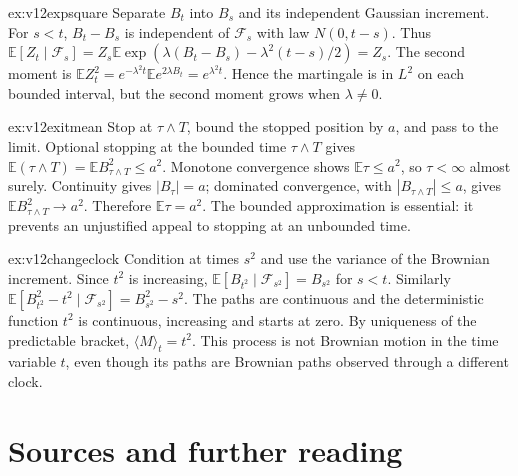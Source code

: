 \begin{solution}{ex:v12expsquare}
\idea Separate $B_t$ into $B_s$ and its independent Gaussian increment.
\writeup For $s<t$, $B_t-B_s$ is independent of $\mathcal F_s$ with law $N(0,t-s)$. Thus $\mathbb E[Z_t\mid\mathcal F_s]=Z_s\mathbb E\exp(\lambda(B_t-B_s)-\lambda^2(t-s)/2)=Z_s$. The second moment is $\mathbb EZ_t^2=e^{-\lambda^2t}\mathbb Ee^{2\lambda B_t}=e^{\lambda^2t}$. Hence the martingale is in $L^2$ on each bounded interval, but the second moment grows when $\lambda\ne0$.
\end{solution}

\begin{solution}{ex:v12exitmean}
\idea Stop at $\tau\wedge T$, bound the stopped position by $a$, and pass to the limit.
\writeup Optional stopping at the bounded time $\tau\wedge T$ gives $\mathbb E(\tau\wedge T)=\mathbb EB_{\tau\wedge T}^2\le a^2$. Monotone convergence shows $\mathbb E\tau\le a^2$, so $\tau<\infty$ almost surely. Continuity gives $|B_\tau|=a$; dominated convergence, with $|B_{\tau\wedge T}|\le a$, gives $\mathbb EB_{\tau\wedge T}^2\to a^2$. Therefore $\mathbb E\tau=a^2$. The bounded approximation is essential: it prevents an unjustified appeal to stopping at an unbounded time.
\end{solution}

\begin{solution}{ex:v12changeclock}
\idea Condition at times $s^2$ and use the variance of the Brownian increment.
\writeup Since $t^2$ is increasing, $\mathbb E[B_{t^2}\mid\mathcal F_{s^2}]=B_{s^2}$ for $s<t$. Similarly $\mathbb E[B_{t^2}^2-t^2\mid\mathcal F_{s^2}]=B_{s^2}^2-s^2$. The paths are continuous and the deterministic function $t^2$ is continuous, increasing and starts at zero. By uniqueness of the predictable bracket, $\langle M\rangle_t=t^2$. This process is not Brownian motion in the time variable $t$, even though its paths are Brownian paths observed through a different clock.
\end{solution}

\section*{Sources and further reading}

